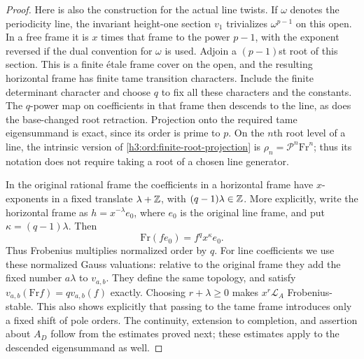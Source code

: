 \begin{proof}
Here is also the construction for the actual line twists.  If
$\omega$ denotes the periodicity line, the invariant height-one
section $v_1$ trivializes $\omega^{p-1}$ on this open.
In a free frame it is $x$ times that frame to the power $p-1$,
with the exponent reversed if the dual convention for $\omega$ is
used.  Adjoin a $(p-1)$st root of this section.  This is a finite
\'{e}tale frame cover on the open, and the resulting horizontal frame
has finite tame transition characters.  Include the finite
determinant character and choose $q$ to fix all these characters and
the constants.  The $q$-power map on coefficients in that frame then
descends to the line, as does the base-changed root retraction.
Projection onto the required tame eigensummand is exact, since its
order is prime to $p$.
On the $n$th root level of a line, the intrinsic version of
\eqref{h3:ord:finite-root-projection} is
$\rho_n=\mathcal P^n\mathrm{Fr}^n$; thus its notation does not
require taking a root of a chosen line generator.

In the original rational frame the coefficients in a horizontal frame
have $x$-exponents in a fixed translate $\lambda+\mathbb Z$, with
$(q-1)\lambda\in\mathbb Z$.  More explicitly, write the horizontal
frame as $h=x^{-\lambda}e_0$, where $e_0$ is the original line
frame, and put $\kappa=(q-1)\lambda$.  Then
\[
 \mathrm{Fr}(fe_0)=f^q x^\kappa e_0.
\]
Thus Frobenius multiplies normalized order by $q$.
For line coefficients we use these normalized Gauss
valuations: relative to the original frame they add the fixed number
$a\lambda$ to $v_{a,b}$.  They define the same topology, and satisfy
$v_{a,b}(\mathrm{Fr}f)=qv_{a,b}(f)$ exactly.
Choosing $r+\lambda\geq0$ makes
$x^r\mathcal L_A$ Frobenius-stable.  This also shows explicitly that
passing to the tame frame introduces only a fixed shift of pole
orders.  The continuity, extension to completion, and assertion about
$A_D$ follow from the estimates proved next; these estimates apply to
the descended eigensummand as well.
\end{proof}

